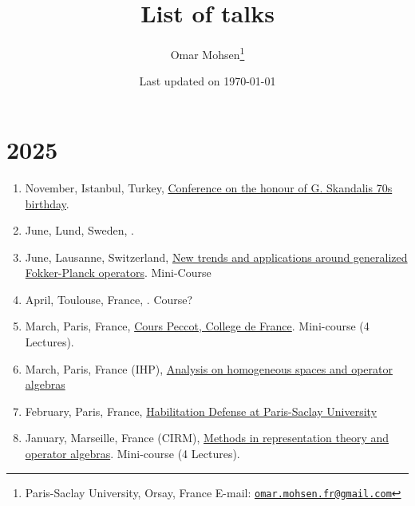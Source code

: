 \documentclass[a4paper, 13pt]{article}
\begin{document}
\title{List of talks}
\author{Omar Mohsen\thanks{
Paris-Saclay University, Orsay, France
\vskip-2pt E-mail: \href{mailto:omar.mohsen.fr@gmail.com}{\texttt{omar.mohsen.fr@gmail.com}}}}
\date{Last updated on \today}
\maketitle
\section*{2025}
  \begin{enumerate}
    \item November, Istanbul, Turkey, \href{}{Conference on the honour of G. Skandalis 70s birthday}.
    \item June, Lund, Sweden, \href{}{}.
    \item June, Lausanne, Switzerland, \href{https://bernoulli.epfl.ch/programs/new-trends-and-applications-around-generalized-fokker-planck-operators/}{New trends and applications around generalized Fokker-Planck operators}. Mini-Course 
    \item April, Toulouse, France, \href{}{}. Course?
    \item March, Paris, France, \href{https://www.college-de-france.fr/fr/agenda/conferencier-invite/on-maximal-hypoellipticity-and-sub-riemannian-geometry}{Cours Peccot, College de France}. Mini-course (4 Lectures).
    \item March, Paris, France (IHP), \href{https://indico.math.cnrs.fr/event/10858/}{Analysis on homogeneous spaces and operator algebras}
    \item February, Paris, France, \href{https://www.imo.universite-paris-saclay.fr/en/events/7558}{Habilitation Defense at Paris-Saclay University}
    \item January,  Marseille, France (CIRM), \href{https://conferences.cirm-math.fr/3227.html}{Methods in representation theory and operator algebras}. Mini-course (4 Lectures).
  \end{enumerate}
\end{document}
